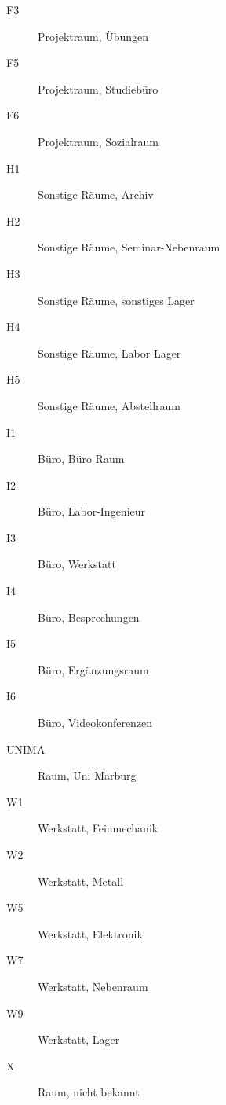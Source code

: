 \begin{multicols}{2}
\begin{description}
		\item[F3]	Projektraum, Übungen
		\item[F5]	Projektraum, Studiebüro
		\item[F6]	Projektraum, Sozialraum
		\item[H1]	Sonstige Räume, Archiv
		\item[H2]	Sonstige Räume, Seminar-Nebenraum
		\item[H3]	Sonstige Räume, sonstiges Lager
		\item[H4]	Sonstige Räume, Labor Lager
		\item[H5]	Sonstige Räume, Abstellraum
		\item[I1]	Büro, Büro	Raum
		\item[I2]	Büro, Labor-Ingenieur
		\item[I3]	Büro, Werkstatt
		\item[I4]	Büro, Besprechungen
		\item[I5]	Büro, Ergänzungsraum
		\item[I6]	Büro, Videokonferenzen
		\item[UNIMA]	Raum, Uni Marburg
		\item[W1]	Werkstatt, Feinmechanik
		\item[W2]	Werkstatt, Metall
		\item[W5]	Werkstatt, Elektronik
		\item[W7]	Werkstatt, Nebenraum
		\item[W9]	Werkstatt, Lager
		\item[X]	Raum, nicht bekannt
	\end{description}
\end{multicols}